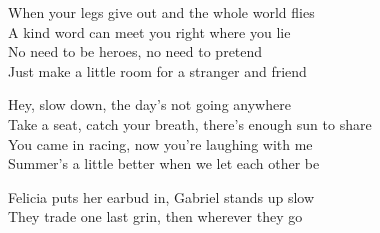 \begin{lyrics}
When your legs give out and the whole world flies\\
A kind word can meet you right where you lie\\
No need to be heroes, no need to pretend\\
Just make a little room for a stranger and friend

Hey, slow down, the day's not going anywhere\\
Take a seat, catch your breath, there's enough sun to share\\
You came in racing, now you're laughing with me\\
Summer's a little better when we let each other be

Felicia puts her earbud in, Gabriel stands up slow\\
They trade one last grin, then wherever they go
\end{lyrics}

